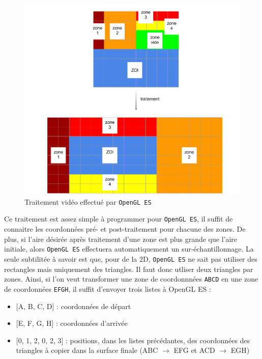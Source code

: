 \documentclass[11pt,a4paper]{article}
\begin{document}
\begin{figure}[H]
\begin{center}
\includegraphics[scale=0.35]{images/schema_traitement_video_retour.png}
\end{center}
\caption{Traitement vidéo effectué par \texttt{OpenGL ES}}
\label{}
\end{figure}

\bigbreak
Ce traitement est assez simple à programmer pour \texttt{OpenGL ES}, il suffit de connaitre les coordonnées pré- et post-traitement pour chacune des zones.
De plus, si l'aire désirée après traitement d'une zone est plus grande que l'aire initiale, alors \texttt{OpenGL ES} effectuera automatiquement un sur-échantillonnage.
La seule subtilitée à savoir est que, pour de la 2D, \texttt{OpenGL ES} ne sait pas utiliser des rectangles mais uniquement des triangles.
Il faut donc utliser deux triangles par zones.
Ainsi, si l'on veut transformer une zone de coordonnnées \texttt{ABCD} en une zone de coordonnées \texttt{EFGH}, il suffit d'envoyer trois listes à OpenGL ES :

\bigbreak
\begin{itemize}
\item{[A, B, C, D] : coordonnées de départ}
\item{[E, F, G, H] : coordonnées d'arrivée}
\item{[0, 1, 2, 0, 2, 3] : positions, dans les listes précédantes, des coordonnées des triangles à copier dans la surface finale (ABC $\rightarrow$ EFG et ACD $\rightarrow$ EGH)}
\end{itemize}
\end{document}
